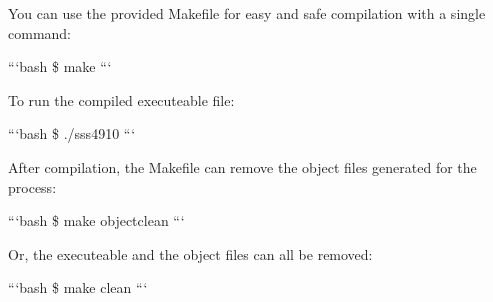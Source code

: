 You can use the provided Makefile for easy and safe compilation with a single command\-:

```bash \$ make ```

To run the compiled executeable file\-:

```bash \$ ./sss4910 ```

After compilation, the Makefile can remove the object files generated for the process\-:

```bash \$ make objectclean ```

Or, the executeable and the object files can all be removed\-:

```bash \$ make clean ``` 